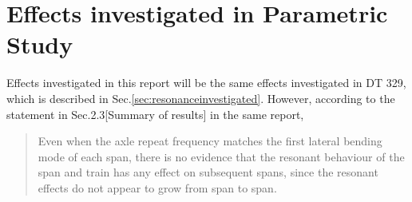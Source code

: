 





\section{Effects investigated in Parametric Study}

Effects investigated in this report will be the same effects investigated in DT 329, which is described in Sec.\ref{sec:resonanceinvestigated}. However, according to the statement in Sec.2.3[Summary of results] in the same report,

\begin{quote}
Even when the axle repeat frequency matches the first lateral bending mode of each span, there is no evidence that the resonant behaviour of the span and train has any effect on subsequent spans, since the resonant effects do not appear to grow from span to span.
\end{quote}


